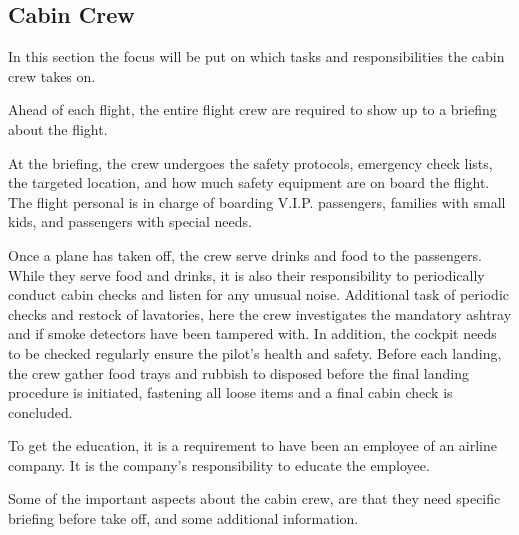 \subsection{Cabin Crew}
In this section the focus will be put on which tasks and responsibilities the cabin crew takes on. 

Ahead of each flight, the entire flight crew are required to show up to a briefing about the flight.

At the briefing, the crew undergoes the safety protocols, emergency check lists, the targeted location, and how much safety equipment are on board the flight. The flight personal is in charge of boarding V.I.P. passengers, families with small kids, and passengers with special needs.

Once a plane has taken off, the crew serve drinks and food to the passengers. While they serve food and drinks, it is also their responsibility to periodically conduct cabin checks and listen for any unusual noise. Additional task of periodic checks and restock of lavatories, here the crew investigates the mandatory ashtray and if smoke detectors have been tampered with. In addition, the cockpit needs to be checked regularly ensure the pilot's health and safety. Before each landing, the crew gather food trays and rubbish to disposed before the final landing procedure is initiated, fastening all loose items and a final cabin check is concluded.

To get the education, it is a requirement to have been an employee of an airline company. It is the company’s responsibility to educate the employee. 

Some of the important aspects about the cabin crew, are that they need specific briefing before take off, and some additional information.
